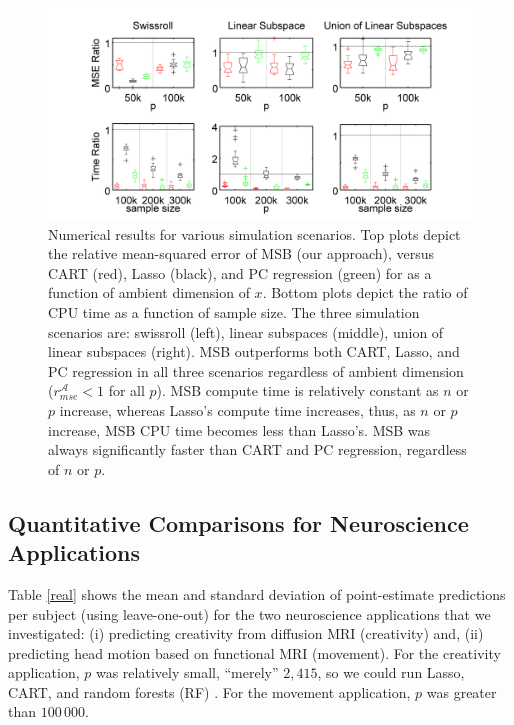 \documentclass{article} %
\providecommand{\mc}[1]{\mathcal{#1}}
\begin{document}
\begin{figure}[h!]
\centering
 \vskip -0pt 
\includegraphics[width=1.0\linewidth]{../figs/boxplots.png}
 \vskip -10pt 
\caption{
Numerical results for various simulation scenarios.  Top plots depict the relative mean-squared error of MSB (our approach), versus CART (red), Lasso (black), and PC regression (green) for as a function of ambient dimension of $x$.  
Bottom plots depict the ratio of CPU time as a function of sample size.
The three simulation scenarios are: 
swissroll (left),
linear subspaces (middle), 
union of linear subspaces (right). 
MSB outperforms both CART, Lasso, and PC regression in all three scenarios regardless of ambient dimension ($r_{mse}^{\mc{A}}< 1$ for all $p$).  MSB compute time is relatively constant as $n$ or $p$ increase, whereas Lasso's compute time increases, thus, as $n$ or $p$ increase, MSB CPU time becomes less than Lasso's.  MSB was always significantly faster than CART and PC regression, regardless of $n$ or $p$. } 

\label{fig:boxplots}
\end{figure}

 



\subsection{Quantitative Comparisons for Neuroscience Applications} \label{sub:real}



Table \ref{real} shows the mean and standard deviation of point-estimate predictions per subject (using leave-one-out) for the two neuroscience applications that we investigated: (i) predicting creativity from diffusion MRI (creativity) and, (ii) predicting head motion based on functional MRI (movement).  For the creativity application, $p$ was relatively small, ``merely'' $2,415$, so we could run Lasso, CART, and random forests (RF) \cite{Brieman2001}.  For the movement application, $p$ was greater than $100\,000$. 
\end{document}

